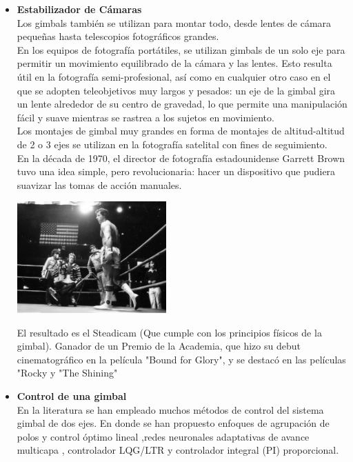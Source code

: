 \begin{itemize}
	\item \textbf{Estabilizador de Cámaras}\\
		  Los gimbals también se utilizan para montar todo, desde lentes de cámara pequeñas
		  hasta telescopios fotográficos grandes.\\
		  En los equipos de fotografía portátiles, se utilizan gimbals de un
		  solo eje para permitir un movimiento equilibrado de la cámara y las lentes.
		  Esto resulta útil en la fotografía semi-profesional, así como en cualquier otro
		  caso en el que se adopten teleobjetivos muy largos y pesados: un eje de la gimbal
		  gira un lente alrededor de su centro de gravedad, lo que permite una manipulación
		  fácil y suave mientras se rastrea a los sujetos en movimiento.\\
		  Los montajes de gimbal muy grandes en forma de montajes de altitud-altitud de 2 o 3 ejes
		  se utilizan en la fotografía satelital con fines de seguimiento.\\
		  En la década de 1970, el director de fotografía estadounidense Garrett Brown tuvo
		  una idea simple, pero revolucionaria: hacer un dispositivo que pudiera suavizar las
		  tomas de acción manuales.
	      \begin{center}
		      \includegraphics[width=0.45\textwidth]{Contenido/Cuerpo/Capitulo1/Fig4.eps}
		      \label{fig:Introduccion:Fig5}
	      \end{center}

	      El resultado es el Steadicam (Que cumple con los principios físicos de la gimbal).
	      Ganador de un Premio de la Academia, que hizo su debut cinematográfico en la
	      película "Bound for Glory", y se destacó en las películas "Rocky y "The Shining"

	\item \textbf{Control de una gimbal}\\
	      En la literatura se han empleado muchos métodos de control del sistema gimbal de dos ejes. En donde se han propuesto enfoques de agrupación de polos y control óptimo
	      lineal \cite{Paper::Salatun1983},redes neuronales adaptativas de avance multicapa \cite{Paper::Lin2001}, controlador LQG/LTR \cite{Paper::Lee2006} y controlador integral
	      (PI) proporcional\cite{Paper::Kim2010}.

\end{itemize}

